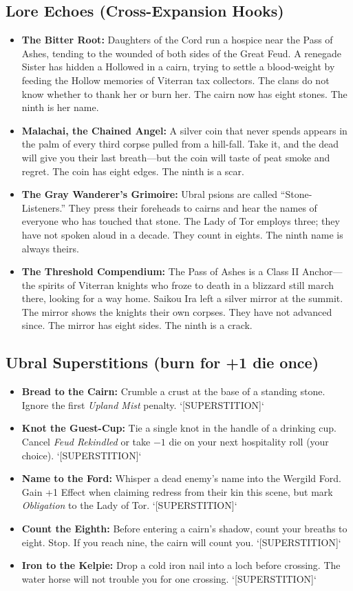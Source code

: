 \subsection*{Lore Echoes (Cross-Expansion Hooks)}
\begin{itemize}
  \item \textbf{The Bitter Root:} Daughters of the Cord run a hospice near the Pass of Ashes, tending to the wounded of both sides of the Great Feud. A renegade Sister has hidden a Hollowed in a cairn, trying to settle a blood-weight by feeding the Hollow memories of Viterran tax collectors. The clans do not know whether to thank her or burn her. The cairn now has eight stones. The ninth is her name.
  \item \textbf{Malachai, the Chained Angel:} A silver coin that never spends appears in the palm of every third corpse pulled from a hill-fall. Take it, and the dead will give you their last breath---but the coin will taste of peat smoke and regret. The coin has eight edges. The ninth is a scar.
  \item \textbf{The Gray Wanderer's Grimoire:} Ubral psions are called ``Stone-Listeners.'' They press their foreheads to cairns and hear the names of everyone who has touched that stone. The Lady of Tor employs three; they have not spoken aloud in a decade. They count in eights. The ninth name is always theirs.
  \item \textbf{The Threshold Compendium:} The Pass of Ashes is a Class II Anchor---the spirits of Viterran knights who froze to death in a blizzard still march there, looking for a way home. Saikou Ira left a silver mirror at the summit. The mirror shows the knights their own corpses. They have not advanced since. The mirror has eight sides. The ninth is a crack.
\end{itemize}

\subsection*{Ubral Superstitions (burn for +1 die once)}
\begin{itemize}
  \item \textbf{Bread to the Cairn:} Crumble a crust at the base of a standing stone. Ignore the first \emph{Upland Mist} penalty. `[SUPERSTITION]`
  \item \textbf{Knot the Guest-Cup:} Tie a single knot in the handle of a drinking cup. Cancel \emph{Feud Rekindled} or take \(-1\) die on your next hospitality roll (your choice). `[SUPERSTITION]`
  \item \textbf{Name to the Ford:} Whisper a dead enemy's name into the Wergild Ford. Gain +1 Effect when claiming redress from their kin this scene, but mark \emph{Obligation} to the Lady of Tor. `[SUPERSTITION]`
  \item \textbf{Count the Eighth:} Before entering a cairn's shadow, count your breaths to eight. Stop. If you reach nine, the cairn will count you. `[SUPERSTITION]`
  \item \textbf{Iron to the Kelpie:} Drop a cold iron nail into a loch before crossing. The water horse will not trouble you for one crossing. `[SUPERSTITION]`
\end{itemize}

